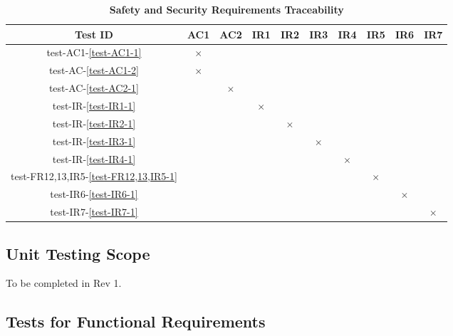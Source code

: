 \documentclass[12pt, titlepage]{article}
\begin{document}
\begin{landscape}
\begin{table} [H]
  \centering
  \begin{tabular}{|c|c|c|c|c|c|c|c|c|c|}
  \hline
  Test ID & AC1 & AC2 & IR1 & IR2 & IR3 & IR4 & IR5 & IR6 & IR7 \\
  \hline
  test-AC1-\ref{test-AC1-1} & $\times$ & & & & & & & & \\
  \hline
  test-AC-\ref{test-AC1-2} & $\times$ & & & & & & & & \\
  \hline
  test-AC-\ref{test-AC2-1} & & $\times$ & & & & & & & \\
  \hline
  test-IR-\ref{test-IR1-1} & & & $\times$ & & & & & &  \\
  \hline
  test-IR-\ref{test-IR2-1}  & & & & $\times$ & & & & & \\
  \hline
  test-IR-\ref{test-IR3-1}  & & & & & $\times$ & & & & \\
  \hline
  test-IR-\ref{test-IR4-1}  & & & & & & $\times$ & & & \\
  \hline
  test-FR12,13,IR5-\ref{test-FR12,13,IR5-1} & & & & & & & $\times$ & & \\
  \hline
  test-IR6-\ref{test-IR6-1}  & & & & & & & & $\times$ & \\
  \hline
  test-IR7-\ref{test-IR7-1}  & & & & & & & & & $\times$ \\
  \hline
\end{tabular}
\caption{\bf Safety and Security Requirements Traceability} \label{tab:sns-test-traceability}
\end{table}

\end{landscape}
\newpage




\subsection{Unit Testing Scope}

To be completed in Rev 1.


\subsection{Tests for Functional Requirements}
\end{document}
